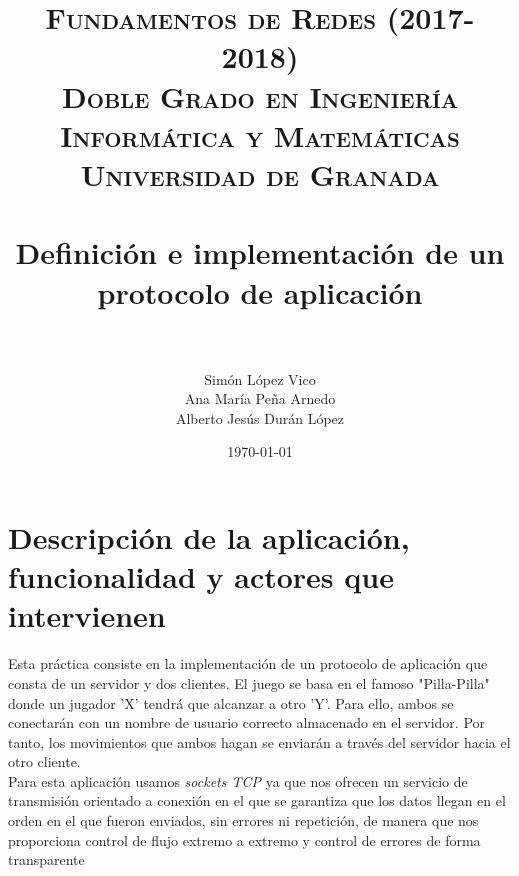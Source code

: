

\title{	
	\normalfont \normalsize 
	\textsc{\textbf{Fundamentos de Redes (2017-2018)} \\ Doble Grado en Ingeniería Informática y Matemáticas \\ Universidad de Granada} \\ [25pt] 
	\horrule{0.5pt} \\[0.4cm]
	\huge Definición e implementación de un \\ protocolo de aplicación \\ 
	\horrule{2pt} \\[0.5cm] 
}

\author{Simón López Vico \\ Ana María Peña Arnedo \\ Alberto Jesús Durán López} 
\date{\normalsize\today}



	\maketitle       %
	\newpage 
	\tableofcontents %
	\newpage
	
	

	
	
\section{Descripción de la aplicación, funcionalidad y actores que intervienen}
	
	
Esta práctica consiste en la implementación de un protocolo de aplicación que consta
de un servidor y dos clientes. El juego se basa en el famoso "Pilla-Pilla"   donde 
un jugador 'X' tendrá que alcanzar a otro 'Y'. Para ello, ambos se conectarán con un nombre de usuario correcto almacenado en el servidor. Por tanto, los movimientos que ambos hagan se enviarán a través del servidor hacia el otro cliente. \\
		
Para esta aplicación usamos \textit{sockets TCP} ya que nos ofrecen un servicio de transmisión orientado a conexión en el que se garantiza que los datos llegan en el orden en el que fueron enviados, sin errores ni repetición, de manera que nos proporciona control de flujo extremo a extremo y control de errores de forma transparente

